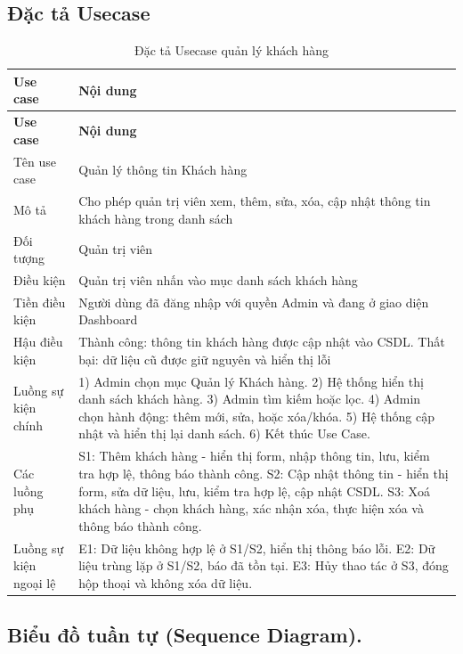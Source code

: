 \documentclass[../BTL.tex]{subfiles}
\begin{document}
\subsection{Đặc tả Usecase}
\begin{longtable}{|p{}|p{}|}
\caption{Đặc tả Usecase quản lý khách hàng}\label{tab:usecase-quan-ly-khach-hang}\\
\hline
\textbf{Use case} & \textbf{Nội dung} \\
\hline
\endfirsthead
\hline
\textbf{Use case} & \textbf{Nội dung} \\
\hline
\endhead
Tên use case & Quản lý thông tin Khách hàng \\
\hline
Mô tả & Cho phép quản trị viên xem, thêm, sửa, xóa, cập nhật thông tin khách hàng trong danh sách \\
\hline
Đối tượng & Quản trị viên \\
\hline
Điều kiện & Quản trị viên nhấn vào mục danh sách khách hàng \\
\hline
Tiền điều kiện & Người dùng đã đăng nhập với quyền Admin và đang ở giao diện Dashboard \\
\hline
Hậu điều kiện & Thành công: thông tin khách hàng được cập nhật vào CSDL. Thất bại: dữ liệu cũ được giữ nguyên và hiển thị lỗi \\
\hline
Luồng sự kiện chính & 1) Admin chọn mục Quản lý Khách hàng. 2) Hệ thống hiển thị danh sách khách hàng. 3) Admin tìm kiếm hoặc lọc. 4) Admin chọn hành động: thêm mới, sửa, hoặc xóa/khóa. 5) Hệ thống cập nhật và hiển thị lại danh sách. 6) Kết thúc Use Case. \\
\hline
Các luồng phụ & S1: Thêm khách hàng - hiển thị form, nhập thông tin, lưu, kiểm tra hợp lệ, thông báo thành công. S2: Cập nhật thông tin - hiển thị form, sửa dữ liệu, lưu, kiểm tra hợp lệ, cập nhật CSDL. S3: Xoá khách hàng - chọn khách hàng, xác nhận xóa, thực hiện xóa và thông báo thành công. \\
\hline
Luồng sự kiện ngoại lệ & E1: Dữ liệu không hợp lệ ở S1/S2, hiển thị thông báo lỗi. E2: Dữ liệu trùng lặp ở S1/S2, báo đã tồn tại. E3: Hủy thao tác ở S3, đóng hộp thoại và không xóa dữ liệu. \\
\hline
\end{longtable}

\subsection{Biểu đồ tuần tự (Sequence Diagram).}
\end{document}
